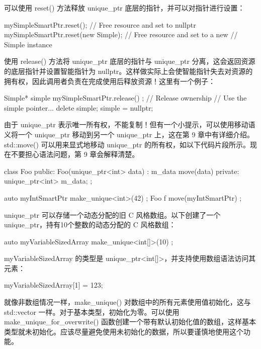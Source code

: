 可以使用 reset() 方法释放 unique\_ptr 底层的指针，并可以对指针进行设置：

\begin{cpp}
mySimpleSmartPtr.reset(); // Free resource and set to nullptr
mySimpleSmartPtr.reset(new Simple{}); // Free resource and set to a new
// Simple instance
\end{cpp}

使用 release() 方法将 unique\_ptr 底层的指针与 unique\_ptr 分离，这会返回资源的底层指针并设置智能指针为 nullptr。这样做实际上会使智能指针失去对资源的拥有权，因此调用者负责在完成使用后释放资源！这里有一个例子：

\begin{cpp}
Simple* simple { mySimpleSmartPtr.release() }; // Release ownership
// Use the simple pointer...
delete simple;
simple = nullptr;
\end{cpp}

由于 unique\_ptr 表示唯一所有权，不能复制！但有一个小提示，可以使用移动语义将一个 unique\_ptr 移动到另一个 unique\_ptr 上，这在第 9 章中有详细介绍。std::move() 可以用来显式地移动 unique\_ptr 的所有权，如以下代码片段所示。现在不要担心语法问题，第 9 章会解释清楚。

\begin{cpp}
class Foo
{
    public:
    Foo(unique_ptr<int> data) : m_data { move(data) } { }
    private:
    unique_ptr<int> m_data;
};

auto myIntSmartPtr { make_unique<int>(42) };
Foo f { move(myIntSmartPtr) };
\end{cpp}


unique\_ptr 可以存储一个动态分配的旧 C 风格数组。以下创建了一个 unique\_ptr，持有10个整数的动态分配的 C 风格数组：

\begin{cpp}
auto myVariableSizedArray { make_unique<int[]>(10) };
\end{cpp}

myVariableSizedArray 的类型是 unique\_ptr<int[]>，并支持使用数组语法访问其元素：

\begin{cpp}
myVariableSizedArray[1] = 123;
\end{cpp}

就像非数组情况一样，make\_unique() 对数组中的所有元素使用值初始化，这与 std::vector 一样。对于基本类型，初始化为零。可以使用 make\_unique\_for\_overwrite() 函数创建一个带有默认初始化值的数组，这样基本类型就未初始化。应该尽量避免使用未初始化的数据，所以要谨慎地使用这个功能。

